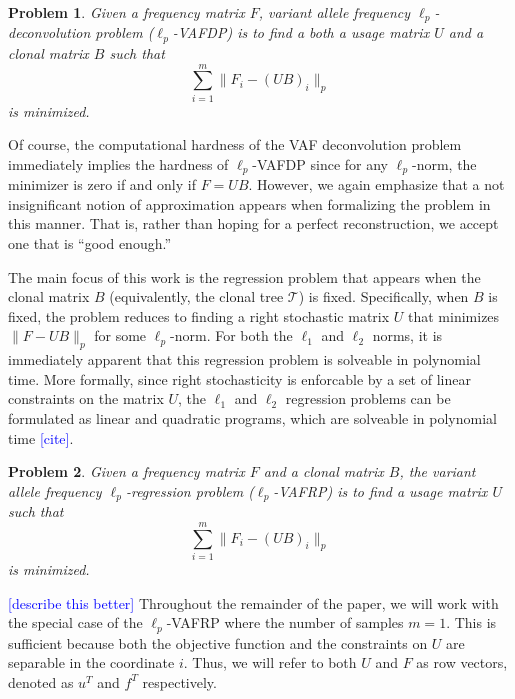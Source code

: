 \documentclass[10pt]{article}
\newtheorem{problem}{Problem}
\newcommand{\henri}[1]{\textcolor{blue}{[#1]}}
\newcommand{\tree}{\mathcal{T}}
\begin{document}
\begin{problem}
  \label{prob:vafp}
  Given a frequency matrix $F$, \emph{variant allele frequency $\ell_p$-deconvolution problem} ($\ell_p$-VAFDP) is to
  find a both a usage matrix $U$ and a clonal matrix $B$ such that 
  \begin{equation}
    \sum_{i=1}^m\lVert F_i - (UB)_i \rVert_p
  \end{equation}
  is minimized.
\end{problem}

Of course, the computational hardness of the VAF deconvolution problem immediately implies the hardness of 
$\ell_p$-VAFDP since for any $\ell_p$-norm, the minimizer is zero if and only if $F = UB$. However, we 
again emphasize that a not insignificant notion of approximation appears when formalizing the problem in this 
manner. That is, rather than hoping for a perfect reconstruction, we accept one that is ``good enough.''

The main focus of this work is the regression problem that appears when the
clonal matrix $B$ (equivalently, the clonal tree $\tree$) is fixed. Specifically,
when $B$ is fixed, the problem reduces to finding a right stochastic matrix $U$
that minimizes $\lVert F - UB\lVert_p$ for some $\ell_p$-norm. For both the $\ell_1$ and $\ell_2$ norms, 
it is immediately apparent that this regression problem is solveable in polynomial time. 
More formally, since right stochasticity is enforcable by a set of linear constraints on the matrix $U$,
the $\ell_1$ and $\ell_2$ regression problems can be formulated as linear and quadratic programs, 
which are solveable in polynomial time \henri{cite}. 

\begin{problem}
  \label{prob:vafpp}
  Given a frequency matrix $F$ and a clonal matrix $B$, the 
  \emph{variant allele frequency $\ell_p$-regression problem} ($\ell_p$-VAFRP) is to
  find a usage matrix $U$ such that 
  \begin{equation}
    \sum_{i=1}^m\lVert F_i - (UB)_i \rVert_p
  \end{equation}
  is minimized.
\end{problem}

\henri{describe this better}
Throughout the remainder of the paper, we will work with the special case of 
the $\ell_p$-VAFRP where the number of samples $m = 1$. This is sufficient because both the objective 
function and the constraints on $U$ are separable in the coordinate 
$i$. Thus, we will refer to both $U$ and $F$ as row vectors, denoted as $u^T$ and $f^T$ 
respectively.
\end{document}
